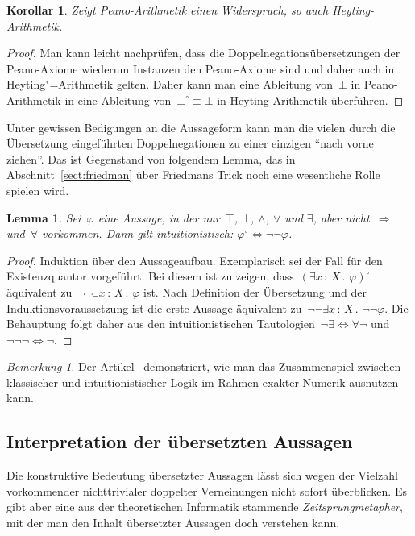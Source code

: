 \documentclass[a4paper,ngerman,12pt]{scrartcl}
\theoremstyle{definition}
\theoremstyle{plain}
\newtheorem{lemma}[defn]{Lemma}
\newtheorem{kor}[defn]{Korollar}
\theoremstyle{remark}
\newtheorem{bem}[defn]{Bemerkung}
\renewcommand{\_}{\mathpunct{.}\,}
\newcommand{\?}{\,{:}\,}
\begin{document}
\begin{kor}Zeigt Peano-Arithmetik einen Widerspruch, so auch
Heyting-Arithmetik.\end{kor}
\begin{proof}Man kann leicht nachprüfen, dass die
Doppelnegationsübersetzungen der Peano-Axiome wiederum Instanzen den
Peano-Axiome sind und daher auch in Heyting"=Arithmetik gelten. Daher kann man
eine Ableitung von~$\bot$ in Peano-Arithmetik in eine Ableitung
von~$\bot^\circ \equiv \bot$ in Heyting-Arithmetik überführen.\end{proof}

Unter gewissen Bedigungen an die Aussageform kann man die vielen durch die
Übersetzung eingeführten Doppelnegationen zu einer einzigen "`nach vorne
ziehen"'. Das ist Gegenstand von folgendem Lemma, das in
Abschnitt~\ref{sect:friedman} über Friedmans Trick noch eine wesentliche Rolle
spielen wird.
\begin{lemma}\label{dnt:geom}Sei~$\varphi$ eine Aussage, in der nur~$\top$, $\bot$,
$\wedge$, $\vee$ und $\exists$, aber nicht~$\Rightarrow$ und~$\forall$ vorkommen. Dann gilt
intuitionistisch: $\varphi^\circ \Longleftrightarrow \neg\neg\varphi$.
\end{lemma}
\begin{proof}Induktion über den Aussageaufbau. Exemplarisch sei der Fall für
den Existenzquantor vorgeführt. Bei diesem ist zu zeigen, dass~$(\exists x\?X\_
\varphi)^\circ$ äquivalent zu~$\neg\neg\exists x\?X\_ \varphi$ ist. Nach
Definition der Übersetzung und der Induktionsvoraussetzung ist die erste
Aussage äquivalent zu~$\neg\neg\exists x\?X\_ \neg\neg\varphi$. Die Behauptung
folgt daher aus den intuitionistischen Tautologien~$\neg\exists \Leftrightarrow
\forall\neg$ und~$\neg\neg\neg \Leftrightarrow \neg$.\end{proof}

\begin{bem}Der Artikel~\cite{oconnor:exact} demonstriert, wie man das
Zusammenspiel zwischen klassischer und intuitionistischer Logik im Rahmen
exakter Numerik ausnutzen kann.\end{bem}


\subsection{Interpretation der übersetzten Aussagen}

Die konstruktive Bedeutung übersetzter Aussagen lässt sich wegen der Vielzahl
vorkommender nichttrivialer doppelter Verneinungen nicht sofort überblicken. Es
gibt aber eine aus der theoretischen Informatik stammende
\emph{Zeitsprungmetapher}, mit der man den Inhalt übersetzter Aussagen doch
verstehen kann.
\end{document}
